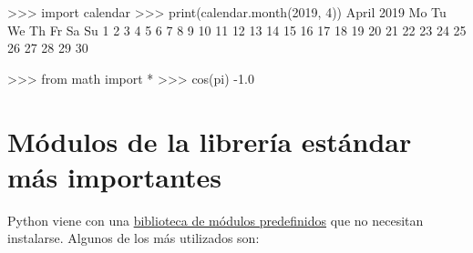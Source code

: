 \documentclass[
  spanish,
  a4paper,
]{scrreport}
\newenvironment{Shaded}{\begin{snugshade}}{\end{snugshade}}
\newcommand{\BuiltInTok}[1]{\textcolor[rgb]{0.00,0.23,0.31}{#1}}
\newcommand{\DecValTok}[1]{\textcolor[rgb]{0.68,0.00,0.00}{#1}}
\newcommand{\FloatTok}[1]{\textcolor[rgb]{0.68,0.00,0.00}{#1}}
\newcommand{\ImportTok}[1]{\textcolor[rgb]{0.00,0.46,0.62}{#1}}
\newcommand{\NormalTok}[1]{\textcolor[rgb]{0.00,0.23,0.31}{#1}}
\newcommand{\OperatorTok}[1]{\textcolor[rgb]{0.37,0.37,0.37}{#1}}
\begin{document}
\begin{Shaded}
\begin{Highlighting}[]
\OperatorTok{\textgreater{}\textgreater{}\textgreater{}} \ImportTok{import}\NormalTok{ calendar}
\OperatorTok{\textgreater{}\textgreater{}\textgreater{}} \BuiltInTok{print}\NormalTok{(calendar.month(}\DecValTok{2019}\NormalTok{, }\DecValTok{4}\NormalTok{))}
\NormalTok{April }\DecValTok{2019}
\NormalTok{Mo Tu We Th Fr Sa Su}
 \DecValTok{1}  \DecValTok{2}  \DecValTok{3}  \DecValTok{4}  \DecValTok{5}  \DecValTok{6}  \DecValTok{7}
 \DecValTok{8}  \DecValTok{9} \DecValTok{10} \DecValTok{11} \DecValTok{12} \DecValTok{13} \DecValTok{14}
\DecValTok{15} \DecValTok{16} \DecValTok{17} \DecValTok{18} \DecValTok{19} \DecValTok{20} \DecValTok{21}
\DecValTok{22} \DecValTok{23} \DecValTok{24} \DecValTok{25} \DecValTok{26} \DecValTok{27} \DecValTok{28}
\DecValTok{29} \DecValTok{30}
\end{Highlighting}
\end{Shaded}

\begin{Shaded}
\begin{Highlighting}[]
\OperatorTok{\textgreater{}\textgreater{}\textgreater{}} \ImportTok{from}\NormalTok{ math }\ImportTok{import} \OperatorTok{*}
\OperatorTok{\textgreater{}\textgreater{}\textgreater{}}\NormalTok{ cos(pi)}
\OperatorTok{{-}}\FloatTok{1.0}
\end{Highlighting}
\end{Shaded}

\section{Módulos de la librería estándar más
importantes}\label{muxf3dulos-de-la-libreruxeda-estuxe1ndar-muxe1s-importantes}

Python viene con una
\href{https://docs.python.org/3/py-modindex.html}{biblioteca de módulos
predefinidos} que no necesitan instalarse. Algunos de los más utilizados
son:
\end{document}
